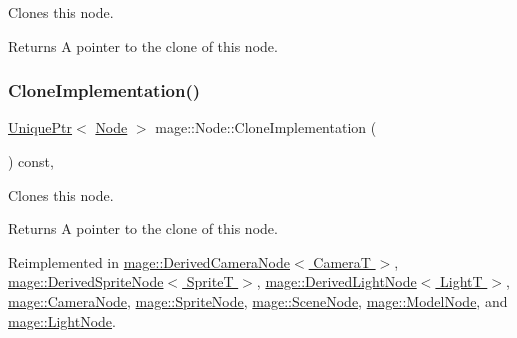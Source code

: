 Clones this node.

\begin{DoxyReturn}{Returns}
A pointer to the clone of this node. 
\end{DoxyReturn}
\hypertarget{classmage_1_1_node_a71a4763bfd4cba5653488b490e61dc8f}{}\label{classmage_1_1_node_a71a4763bfd4cba5653488b490e61dc8f} 
\subsubsection{\texorpdfstring{Clone\+Implementation()}{CloneImplementation()}}
{\footnotesize\ttfamily \hyperlink{namespacemage_a3316d7143a973e37adf1110f2e80ca31}{Unique\+Ptr}$<$ \hyperlink{classmage_1_1_node}{Node} $>$ mage\+::\+Node\+::\+Clone\+Implementation (\begin{DoxyParamCaption}{ }\end{DoxyParamCaption}) const\hspace{0.3cm}{\ttfamily [private]}, {\ttfamily [virtual]}}

Clones this node.

\begin{DoxyReturn}{Returns}
A pointer to the clone of this node. 
\end{DoxyReturn}


Reimplemented in \hyperlink{classmage_1_1_derived_camera_node_aa965751029ebd6b41d3805b499a8304e}{mage\+::\+Derived\+Camera\+Node$<$ Camera\+T $>$}, \hyperlink{classmage_1_1_derived_sprite_node_ae1aa2b80d4ff8688635df017826c11a5}{mage\+::\+Derived\+Sprite\+Node$<$ Sprite\+T $>$}, \hyperlink{classmage_1_1_derived_light_node_acf8858989780bf45a45c55a7c5564314}{mage\+::\+Derived\+Light\+Node$<$ Light\+T $>$}, \hyperlink{classmage_1_1_camera_node_a002d3a2b41cda270a26ca5d8f3a17f55}{mage\+::\+Camera\+Node}, \hyperlink{classmage_1_1_sprite_node_a83a2a865b38670d64491a1066895e218}{mage\+::\+Sprite\+Node}, \hyperlink{classmage_1_1_scene_node_a42d0d53ab804d38ebd584d2de6490eeb}{mage\+::\+Scene\+Node}, \hyperlink{classmage_1_1_model_node_a34146201083015276b38240af307417f}{mage\+::\+Model\+Node}, and \hyperlink{classmage_1_1_light_node_aea97601d0a4b8073a1c655ca334af242}{mage\+::\+Light\+Node}.

\hypertarget{classmage_1_1_node_afb4de0bc346a435745facfbdeda4ac6a}{}\label{classmage_1_1_node_afb4de0bc346a435745facfbdeda4ac6a} 
